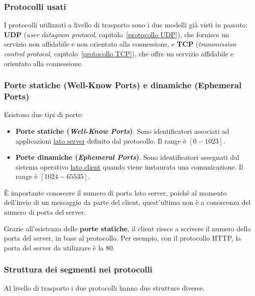 \documentclass[a4paper]{article}
\begin{document}
	\subsubsection{Protocolli usati}
	
	I protocolli utilizzati a livello di trasporto sono i due modelli già visti in passato: \textbf{UDP} (\emph{user datagram protocol}, capitolo~\ref{protocollo UDP}), che fornisce un servizio non affidabile e non orientato alla connessione, e \textbf{TCP} (\emph{transmission control protocol}, capitolo~\ref{protocollo TCP}), che offre un servizio affidabile e orientato alla connessione.\newpage
	
	\subsubsection{Porte statiche (Well-Know Ports) e dinamiche (Ephemeral Ports)}
	
	Esistono due tipi di porte:
	\begin{itemize}
		\item \textcolor{Red3}{\textbf{Porte statiche (\emph{Well-Know Ports})}}. Sono identificatori associati ad applicazioni \underline{lato server} definito dal protocollo. Il range è $\left[0 - 1023\right]$.
		
		\item \textcolor{Red3}{\textbf{Porte dinamiche (\emph{Ephemeral Ports})}}. Sono identificatori assegnati dal sistema operativo \underline{lato client} quando viene instaurata una comunicazione. Il range è $\left[1024 - 65535\right]$.
	\end{itemize}
	È importante conoscere il numero di porta lato server, poiché al momento dell'invio di un messaggio da parte del client, quest'ultimo non è a conoscenza del numero di porta del server.\newline
	
	\noindent
	Grazie all'esistenza delle \textbf{porte statiche}, il client riesce a scrivere il numero della porta del server, in base al protocollo. Per esempio, con il protocollo HTTP, la porta del server da utilizzare è la 80.\newpage
	
	\subsubsection{Struttura dei segmenti nei protocolli}
	
	Al livello di trasporto i due protocolli hanno due strutture diverse.\newline
	
\end{document}
